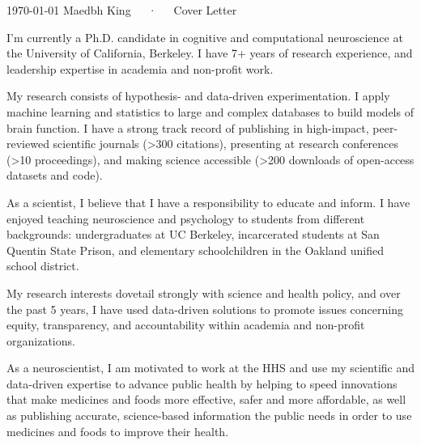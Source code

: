 \documentclass[11pt, a4paper]{maedbh-cv}
\begin{document}
\makecvheader[R]

\makecvfooter
  {\today}
  {Maedbh King~~~·~~~Cover Letter}
  {}

\makelettertitle

\begin{cvletter}

I'm currently a Ph.D. candidate in cognitive and computational neuroscience at the University of California, Berkeley. I have 7+ years of research experience, and leadership expertise in academia and non-profit work. 

	My research consists of hypothesis- and data-driven experimentation. I apply machine learning and statistics to large and complex databases to build models of brain function. I have a strong track record of publishing in high-impact, peer-reviewed scientific journals (>300 citations), presenting at research conferences (>10 proceedings), and making science accessible (>200 downloads of open-access datasets and code). 

	As a scientist, I believe that I have a responsibility to educate and inform. I have enjoyed teaching neuroscience and psychology to students from different backgrounds: undergraduates at UC Berkeley, incarcerated students at San Quentin State Prison, and elementary schoolchildren in the Oakland unified school district. 
	
	My research interests dovetail strongly with science and health policy, and over the past 5 years, I have used data-driven solutions to promote issues concerning equity, transparency, and accountability within academia and non-profit organizations.  


As a neuroscientist, I am motivated to work at the HHS and use my scientific and data-driven expertise to advance public health by helping to speed innovations that make medicines and foods more effective, safer and more affordable, as well as publishing accurate, science-based information the public needs in order to use medicines and foods to improve their health.


\end{cvletter}
\end{document}
